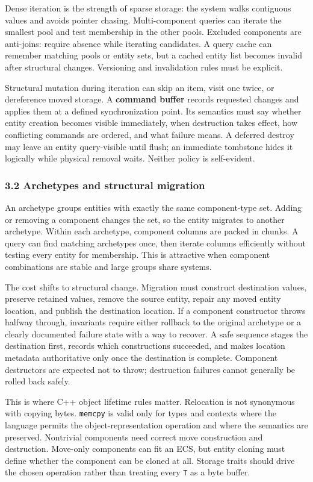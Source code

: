 Dense iteration is the strength of sparse storage: the system walks contiguous values and avoids pointer chasing. Multi-component queries can iterate the smallest pool and test membership in the other pools. Excluded components are anti-joins: require absence while iterating candidates. A query cache can remember matching pools or entity sets, but a cached entity list becomes invalid after structural changes. Versioning and invalidation rules must be explicit.

Structural mutation during iteration can skip an item, visit one twice, or dereference moved storage. A \textbf{command buffer} records requested changes and applies them at a defined synchronization point. Its semantics must say whether entity creation becomes visible immediately, when destruction takes effect, how conflicting commands are ordered, and what failure means. A deferred destroy may leave an entity query-visible until flush; an immediate tombstone hides it logically while physical removal waits. Neither policy is self-evident.

\subsubsection{3.2 Archetypes and structural migration}\label{05-engine-i-ch008-archetypes-and-structural-migration}

An archetype groups entities with exactly the same component-type set. Adding or removing a component changes the set, so the entity migrates to another archetype. Within each archetype, component columns are packed in chunks. A query can find matching archetypes once, then iterate columns efficiently without testing every entity for membership. This is attractive when component combinations are stable and large groups share systems.

The cost shifts to structural change. Migration must construct destination values, preserve retained values, remove the source entity, repair any moved entity location, and publish the destination location. If a component constructor throws halfway through, invariants require either rollback to the original archetype or a clearly documented failure state with a way to recover. A safe sequence stages the destination first, records which constructions succeeded, and makes location metadata authoritative only once the destination is complete. Component destructors are expected not to throw; destruction failures cannot generally be rolled back safely.

This is where C++ object lifetime rules matter. Relocation is not synonymous with copying bytes. \texttt{memcpy} is valid only for types and contexts where the language permits the object-representation operation and where the semantics are preserved. Nontrivial components need correct move construction and destruction. Move-only components can fit an ECS, but entity cloning must define whether the component can be cloned at all. Storage traits should drive the chosen operation rather than treating every \texttt{T} as a byte buffer.

